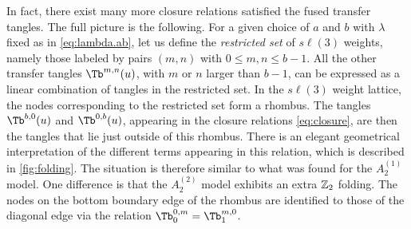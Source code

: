 \documentclass[11pt]{article}
\numberwithin{equation}{section}
\theoremstyle{plain}
\numberwithin{equation}{section}
\renewcommand{\le}{\leqslant}
\begin{document}
In fact, there exist many more closure relations satisfied the fused transfer tangles. The full picture is the following. For a given choice of $a$ and $b$ with $\lambda$ fixed as in \eqref{eq:lambda.ab}, let us define the {\it restricted set} of $s\ell(3)$ weights, namely those labeled by pairs $(m,n)$ with $0\le m,n\le b-1$. All the other transfer tangles $\Tb^{m,n}(u)$, with $m$ or $n$ larger than $b-1$, can be expressed as a linear combination of tangles in the restricted set. In the $s\ell(3)$ weight lattice, the nodes corresponding to the restricted set form a rhombus. The tangles $\Tb^{b,0}(u)$ and $\Tb^{0,b}(u)$, appearing in the closure relations \eqref{eq:closure}, are then the tangles that lie just outside of this rhombus. There is an elegant geometrical interpretation of the different terms appearing in this relation, which is described in \cref{fig:folding}. The situation is therefore similar to what was found for the $A_2^{(1)}$ model. One difference is that the $A_2^{(2)}$ model exhibits an extra ${\Bbb Z}_2$ folding. The nodes on the bottom boundary edge of the rhombus are identified to those of the diagonal edge via the relation $\Tb^{0,m}_0 = \Tb^{m,0}_1$.
\end{document}
